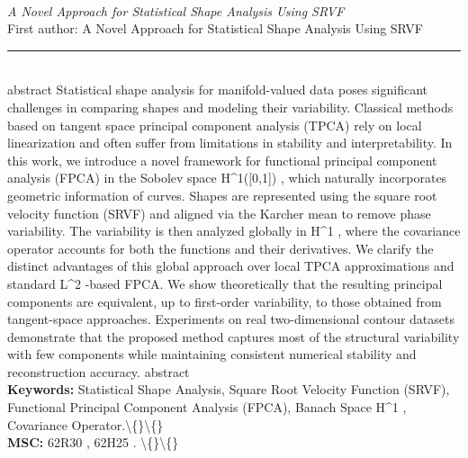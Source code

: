 \documentclass[10pt,twoside]{article}
\begin{document}
\noindent\begin{minipage}[t][\textheight]{\textwidth}
\\[0.35em]
{\itshape A Novel Approach for Statistical Shape Analysis Using SRVF}\\[0.2em]
{\footnotesize First author: A Novel Approach for Statistical Shape Analysis Using SRVF}\\[0.45em]
\noindent\rule{\textwidth}{0.3pt}\\[0.4em]
{\footnotesize  abstract Statistical shape analysis for manifold-valued data poses significant challenges in comparing shapes and modeling their variability. Classical methods based on tangent space principal component analysis (TPCA) rely on local linearization and often suffer from limitations in stability and interpretability. In this work, we introduce a novel framework for functional principal component analysis (FPCA) in the Sobolev space H\textasciicircum{}1([0,1]) , which naturally incorporates geometric information of curves. Shapes are represented using the square root velocity function (SRVF) and aligned via the Karcher mean to remove phase variability. The variability is then analyzed globally in H\textasciicircum{}1 , where the covariance operator accounts for both the functions and their derivatives. We clarify the distinct advantages of this global approach over local TPCA approximations and standard L\textasciicircum{}2 -based FPCA. We show theoretically that the resulting principal components are equivalent, up to first-order variability, to those obtained from tangent-space approaches. Experiments on real two-dimensional contour datasets demonstrate that the proposed method captures most of the structural variability with few components while maintaining consistent numerical stability and reconstruction accuracy. abstract}\\[0.4em]
{\footnotesize\bfseries Keywords:} {\footnotesize Statistical Shape Analysis, Square Root Velocity Function (SRVF), Functional Principal Component Analysis (FPCA), Banach Space H\textasciicircum{}1 , Covariance Operator.\textbackslash\{\}\textbackslash\{\}}\\[0.15em]
{\footnotesize\bfseries MSC:} {\footnotesize 62R30 , 62H25 . \textbackslash\{\}\textbackslash\{\}}\\
\vfill
\end{minipage}
\newpage
\end{document}
